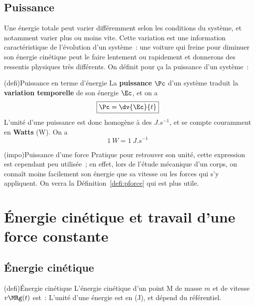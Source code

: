 \documentclass[../../main/main.tex]{subfiles}
\begin{document}
\subsection{Puissance}

Une énergie totale peut varier différemment selon les conditions du système, et
notamment varier plus ou moins vite. Cette variation est une information
caractéristique de l'évolution d'un système~: une voiture qui freine pour
diminuer son énergie cinétique peut le faire lentement ou rapidement et
donnerons des ressentis physiques très différents. On définit pour ça la
puissance d'un système~:

\begin{tcb*}[sidebyside](defi){Puissance en terme d'énergie}
	La \textbf{puissance} $\Pc$ d'un système traduit la \textbf{variation
		temporelle} de son énergie $\Ec$, et on a
	\[\boxed{\Pc = \dv{\Ec}{t}}\]
	\tcblower
	L'unité d'une puissance est donc homogène à des $\si{J.s^{-1}}$, et se compte
	couramment en \textbf{Watts} (W). On a
	\[\boxed{\SI{1}{W} = \SI{1}{J.s^{-1}}}\]
\end{tcb*}

\begin{tcb*}(impo){Puissance d'une force}
	Pratique pour retrouver son unité, cette expression est cependant peu
	utilisée~; en effet, lors de l'étude mécanique d'un corps, on connaît moins
	facilement son énergie que sa vitesse ou les forces qui s'y appliquent. On
	verra la Définition~\ref{defi:pforce} qui est plus utile.
\end{tcb*}

\vspace{-10pt}
\section{Énergie cinétique et travail d'une force constante}
\vspace{-5pt}
\subsection{Énergie cinétique}
\vspace{-10pt}
\begin{tcb*}[sidebyside](defi){Énergie cinétique}
	L'énergie cinétique d'un point M de masse $m$ et de vitesse $v\MRg(t)$ est~:
	\psw{%
		\[\boxed{\Ec_{c,\Mr\Rc} = \frac{1}{2}mv\MRg^2(t)}\]
	}%
	\vspace{-15pt}
	\tcblower
	L'unité d'une énergie est en  (J), et dépend du
	référentiel.
\end{tcb*}
\end{document}
